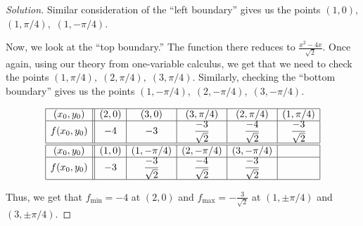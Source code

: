\documentclass[12pt]{article}
\theoremstyle{definition}
\newenvironment{soln}{\begin{proof}[Solution]}{\end{proof}}
\begin{document}
\begin{itemize}
\begin{soln}
		Similar consideration of the ``left boundary'' gives us the points $(1, 0),$ $(1, \pi/4),$ $(1, -\pi/4).$

		Now, we look at the ``top boundary.'' The function there reduces to $\frac{x^2 - 4x}{\sqrt{2}}.$ Once again, using our theory from one-variable calculus, we get that we need to check the points $(1, \pi/4),\;(2, \pi/4),\;(3, \pi/4).$ Similarly, checking the ``bottom boundary'' gives us the points $(1, -\pi/4),\;(2, -\pi/4),\;(3, -\pi/4).$

		
		\begin{equation*} 
			\begin{array}{|c||c|c|c|c|c|}
				\hline
				(x_0, y_0) & (2, 0) & (3, 0) & (3, \pi/4) & (2, \pi/4) & (1, \pi/4) \\
				\hline
				f(x_0, y_0) & -4 & -3 & \dfrac{-3}{\sqrt{2}} & \dfrac{-4}{\sqrt{2}} & \dfrac{-3}{\sqrt{2}} \\
				\hline
				\hline
				(x_0, y_0) & (1, 0) & (1, -\pi/4) & (2, -\pi/4) & (3, -\pi/4) &  \\
				\hline
				f(x_0, y_0) & -3 & \dfrac{-3}{\sqrt{2}} & \dfrac{-4}{\sqrt{2}} & \dfrac{-3}{\sqrt{2}} & \\
				\hline 
				\end{array}
		\end{equation*}

		Thus, we get that $f_{\min} = -4$ at $(2, 0)$ and $f_{\max} = -\frac{3}{\sqrt{2}}$ at $(1, \pm \pi/4)$ and $(3, \pm\pi/4).$
	\end{soln}
\end{itemize}
\end{document}
